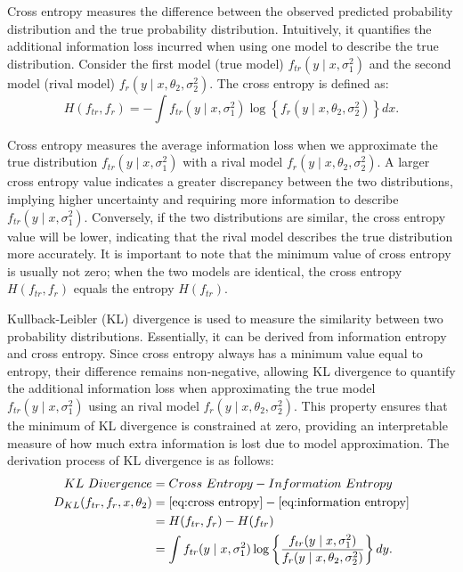 \hspace*{8mm} Cross entropy measures the difference between the observed predicted probability distribution and the true probability distribution. Intuitively, it quantifies the additional information loss incurred when using one model to describe the true distribution. Consider the first model (true model) $f_{tr}(y \mid x, \sigma^2_1)$ and the second model (rival model) $f_r(y \mid x, \theta_2,\sigma^2_2)$. The cross entropy is defined as:
\begin{equation}\label{eq:cross entropy}
H(f_{tr},f_r) = -\int f_{tr}(y \mid x, \sigma^2_1) \log \left\{f_r(y \mid x, \theta_2,\sigma^2_2)\right\} dx.
\end{equation}

\hspace*{8mm} Cross entropy measures the average information loss when we approximate the true distribution $f_{tr}(y \mid x, \sigma^2_1)$ with a rival model $f_r(y \mid x, \theta_2,\sigma^2_2)$. A larger cross entropy value indicates a greater discrepancy between the two distributions, implying higher uncertainty and requiring more information to describe $f_{tr}(y \mid x, \sigma^2_1)$. Conversely, if the two distributions are similar, the cross entropy value will be lower, indicating that the rival model describes the true distribution more accurately. It is important to note that the minimum value of cross entropy is usually not zero; when the two models are identical, the cross entropy $H(f_{tr},f_r)$ equals the entropy $H(f_{tr})$.

\hspace*{8mm} Kullback-Leibler (KL) divergence is used to measure the similarity between two probability distributions. Essentially, it can be derived from information entropy and cross entropy. Since cross entropy always has a minimum value equal to entropy, their difference remains non-negative, allowing KL divergence to quantify the additional information loss when approximating the true model  $f_{tr}(y \mid x, \sigma^2_1)$  using an rival model  $f_r(y \mid x, \theta_2, \sigma^2_2)$. This property ensures that the minimum of KL divergence is constrained at zero, providing an interpretable measure of how much extra information is lost due to model approximation. The derivation process of KL divergence is as follows:  
\begin{align}
KL\ Divergence &= Cross\ Entropy - Information\ Entropy \notag \\
D_{KL}(f_{tr},f_r,x,\theta_2) &= \eqref{eq:cross entropy} - \eqref{eq:information entropy} \notag \\
&= H(f_{tr}, f_r) - H(f_{tr}) \notag \\
&= \int f_{tr}(y \mid x, \sigma^2_1) \log \left\{ \frac{f_{tr}(y \mid x, \sigma^2_1)}{f_r(y \mid x, \theta_2, \sigma^2_2)} \right\} dy. \label{eq:KL-optimal-1}
\end{align}


